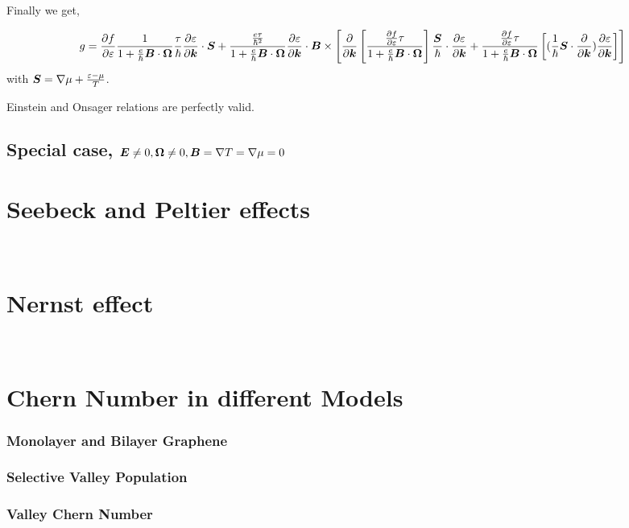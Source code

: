 \documentclass{report}
\renewcommand\vec[1]{\ensuremath\boldsymbol{#1}} %
\begin{document}
Finally we get,

\begin{equation}
g = \frac{\partial f} {\partial \varepsilon}\frac{1}{1 + \frac{e}{\hbar} \vec{B}\cdot\vec{\Omega}}
\frac{\tau}{\hbar} \frac{\partial \varepsilon}{\partial \vec{k}}\cdot  \vec{S} + \frac{\frac{e \tau}{\hbar^2} }{1 + \frac{e}{\hbar} \vec{B}\cdot\vec{\Omega}} \frac{\partial \varepsilon}{\partial \vec{k}} \cdot \vec{B} \times \left[ \frac{\partial}{\partial \vec{k}} \left[ \frac{\frac{\partial f} {\partial \varepsilon} \tau}{1 + \frac{e}{\hbar} \vec{B}\cdot\vec{\Omega}}
\right] \frac{\vec{S}}{\hbar} \cdot \frac{\partial \varepsilon}{\partial \vec{k}} + \frac{\frac{\partial f} {\partial \varepsilon} \tau}{1 + \frac{e}{\hbar} \vec{B}\cdot\vec{\Omega}} \left[(\frac{1}{\hbar} \vec{S}\cdot \frac{\partial }{\partial \vec{k}} )\frac{\partial \varepsilon}{\partial \vec{k}} \right] \right]
\end{equation}\label{Eq:g_non_zero_chem_temp_grad}
with $\vec{S} = \nabla \mu + \frac{\varepsilon - \mu}{T}$.

Einstein and Onsager relations are perfectly valid.

\section{Special case, $\vec{E}\neq 0,\vec{\Omega} \neq 0, \vec{B}=\nabla{T}=\nabla{\mu} = 0$}\label{Sec:Regular-Ohmic}
\chapter{Seebeck and Peltier effects}~\label{chap:Seebeck-Peltier}
\chapter{Nernst effect}~\label{chap:Nernst}
\chapter{Chern Number in different Models}\label{chap:ChernNumber}
\subsection{Monolayer and Bilayer Graphene}
\subsection{Selective Valley Population}
\subsection{Valley Chern Number}
\end{document}
